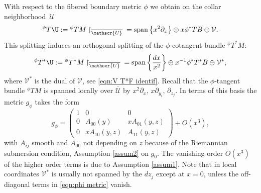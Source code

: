 \documentclass[JEP,XML,SOM,Unicode,NoFloatCountersInSection,published]{cedram}
\theoremstyle{plain}
\theoremstyle{definition}
\newcommand{\Umath}{{\mathscr{U}}}
\newcommand\calV{{\mathcal V}}
\DeclareMathOperator{\Span}{span}
\newcommand{\phiT}{{}^\phi T}
\begin{document}
With respect to the fibered boundary metric $\phi$ we obtain on the collar neighborhood~$\Umath$
\begin{equation}\label{splitting1}
{}^\phi T\U := \phiT M\restriction_{\overline{\mathscr{U}}}{} =
\Span \left\{x^2\partial_x\right\} \oplus x \phi^{*}T B \oplus \calV.
\end{equation}
This splitting induces an orthogonal splitting of the
$\phi$-cotangent bundle ${}^\phi T^*M$:
\begin{equation}\label{splitting2}
{}^\phi T^*\U :=
{}^\phi T^*M \restriction_{\overline{\mathscr{U}}}{} = \Span \left\{ \frac{dx}{x^2}\right\} \oplus x^{-1} \phi^*T^*B \oplus \calV^*,
\end{equation}
where $\calV^*$ is the dual of $\calV$, see \eqref{eqn:V T*F identif}.
Recall that the $\phi$-tangent bundle ${}^\phi TM$ is spanned locally over $\overline{\mathscr{U}}$
by $x^2\partial_x$, $x\partial_{y_i}$, $\partial_{z_j}$. In terms of this basis the metric $g_\phi$ takes the form
\begin{equation}
\label{eqn:phi metric}
g_\phi =
\begin{pmatrix}
1 & 0 & 0 \\
0 & A_{00}(y) & x A_{01}(y,z) \\
0 & x A_{10}(y,z) & A_{11}(y,z)
\end{pmatrix}
+ O(x^3),
\end{equation}
with $A_{ij}$ smooth and $A_{00}$ not depending on $z$ because of the Riemannian submersion condition, Assumption \ref{assum2} on $g_0$.
The vanishing order $O(x^3)$ of the higher order terms is due to Assumption \ref{assum1}.
Note that in local coordinates $\calV^*$ is usually not spanned by the $dz_j$ except at $x=0$, unless the off-diagonal terms in \eqref{eqn:phi metric} vanish.
\end{document}
